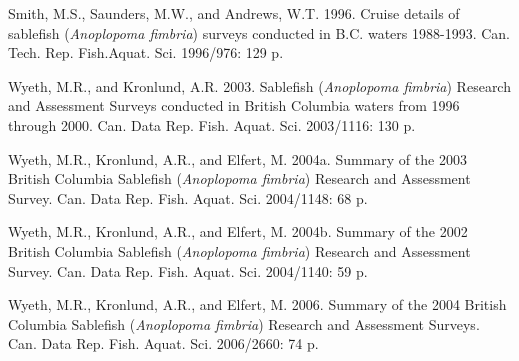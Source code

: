 \documentclass[12pt]{article}\usepackage[]{graphicx}\usepackage[]{color}
\begin{document}
\leavevmode\hypertarget{ref-Smith1996}{}%
Smith, M.S., Saunders, M.W., and Andrews, W.T. 1996. Cruise details of sablefish (\emph{Anoplopoma fimbria}) surveys conducted in B.C. waters 1988-1993. Can. Tech. Rep. Fish.Aquat. Sci. 1996/976: 129 p.

\leavevmode\hypertarget{ref-Wyeth2003}{}%
Wyeth, M.R., and Kronlund, A.R. 2003. Sablefish (\emph{Anoplopoma fimbria}) Research and Assessment Surveys conducted in British Columbia waters from 1996 through 2000. Can. Data Rep. Fish. Aquat. Sci. 2003/1116: 130 p.

\leavevmode\hypertarget{ref-Wyeth2004b}{}%
Wyeth, M.R., Kronlund, A.R., and Elfert, M. 2004a. Summary of the 2003 British Columbia Sablefish (\emph{Anoplopoma fimbria}) Research and Assessment Survey. Can. Data Rep. Fish. Aquat. Sci. 2004/1148: 68 p.

\leavevmode\hypertarget{ref-Wyeth2004a}{}%
Wyeth, M.R., Kronlund, A.R., and Elfert, M. 2004b. Summary of the 2002 British Columbia Sablefish (\emph{Anoplopoma fimbria}) Research and Assessment Survey. Can. Data Rep. Fish. Aquat. Sci. 2004/1140: 59 p.

\leavevmode\hypertarget{ref-Wyeth2006}{}%
Wyeth, M.R., Kronlund, A.R., and Elfert, M. 2006. Summary of the 2004 British Columbia Sablefish (\emph{Anoplopoma fimbria}) Research and Assessment Surveys. Can. Data Rep. Fish. Aquat. Sci. 2006/2660: 74 p.
\end{document}
